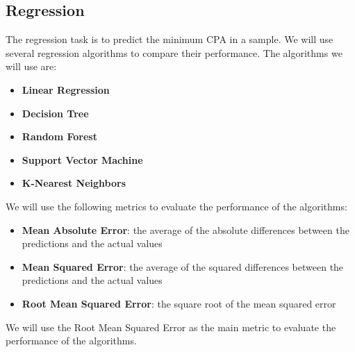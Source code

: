 \subsection{Regression}
The regression task is to predict the minimum CPA in a sample. We will use several regression algorithms to compare their performance. The algorithms we will use are:
\begin{itemize}
    \item \textbf{Linear Regression}
    \item \textbf{Decision Tree}
    \item \textbf{Random Forest}
    \item \textbf{Support Vector Machine}
    \item \textbf{K-Nearest Neighbors}
\end{itemize}
We will use the following metrics to evaluate the performance of the algorithms:
\begin{itemize}
    \item \textbf{Mean Absolute Error}: the average of the absolute differences between the predictions and the actual values
    \item \textbf{Mean Squared Error}: the average of the squared differences between the predictions and the actual values
    \item \textbf{Root Mean Squared Error}: the square root of the mean squared error
\end{itemize}
We will use the Root Mean Squared Error as the main metric to evaluate the performance of the algorithms.
